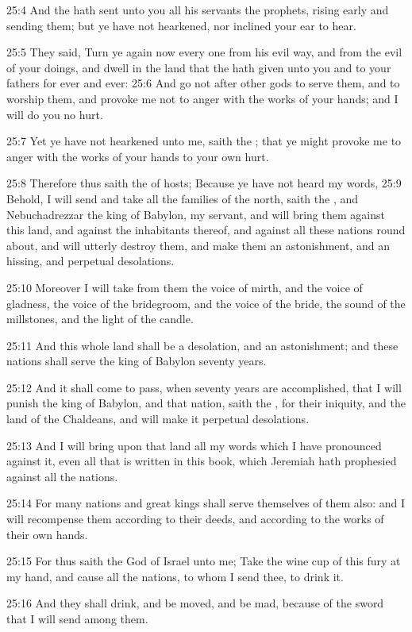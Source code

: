 25:4 And the \LORD hath sent unto you all his servants the prophets, rising early and sending them; but ye have not hearkened, nor inclined your ear to hear.

25:5 They said, Turn ye again now every one from his evil way, and from the evil of your doings, and dwell in the land that the \LORD hath given unto you and to your fathers for ever and ever: 25:6 And go not after other gods to serve them, and to worship them, and provoke me not to anger with the works of your hands; and I will do you no hurt.

25:7 Yet ye have not hearkened unto me, saith the \LORD; that ye might provoke me to anger with the works of your hands to your own hurt.

25:8 Therefore thus saith the \LORD of hosts; Because ye have not heard my words, 25:9 Behold, I will send and take all the families of the north, saith the \LORD, and Nebuchadrezzar the king of Babylon, my servant, and will bring them against this land, and against the inhabitants thereof, and against all these nations round about, and will utterly destroy them, and make them an astonishment, and an hissing, and perpetual desolations.

25:10 Moreover I will take from them the voice of mirth, and the voice of gladness, the voice of the bridegroom, and the voice of the bride, the sound of the millstones, and the light of the candle.

25:11 And this whole land shall be a desolation, and an astonishment; and these nations shall serve the king of Babylon seventy years.

25:12 And it shall come to pass, when seventy years are accomplished, that I will punish the king of Babylon, and that nation, saith the \LORD, for their iniquity, and the land of the Chaldeans, and will make it perpetual desolations.

25:13 And I will bring upon that land all my words which I have pronounced against it, even all that is written in this book, which Jeremiah hath prophesied against all the nations.

25:14 For many nations and great kings shall serve themselves of them also: and I will recompense them according to their deeds, and according to the works of their own hands.

25:15 For thus saith the \LORD God of Israel unto me; Take the wine cup of this fury at my hand, and cause all the nations, to whom I send thee, to drink it.

25:16 And they shall drink, and be moved, and be mad, because of the sword that I will send among them.


